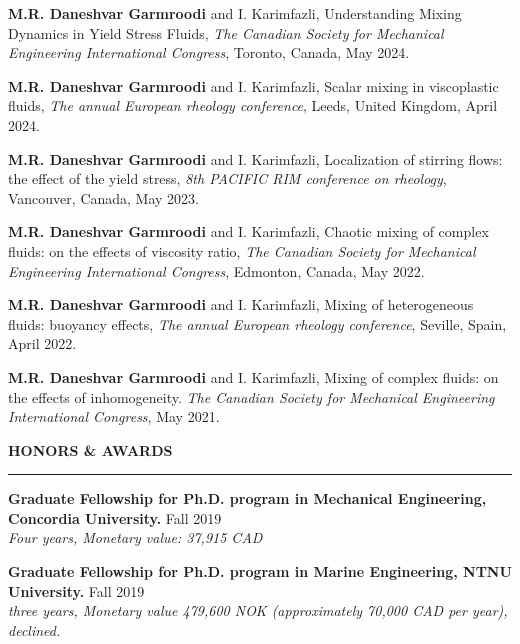 \documentclass[10pt]{article}
\begin{document}
		\noindent  \textbf{M.R. Daneshvar Garmroodi} and I. Karimfazli, Understanding Mixing Dynamics in Yield Stress
		Fluids, \textit{The Canadian Society for Mechanical Engineering International Congress}, Toronto, Canada, May 2024.
		
		\noindent \textbf{M.R. Daneshvar Garmroodi} and I. Karimfazli, Scalar mixing in viscoplastic fluids, \textit{The annual European rheology conference}, Leeds, United Kingdom, April 2024.
		
		\noindent \textbf{M.R. Daneshvar Garmroodi} and I. Karimfazli, Localization of stirring flows: the effect of the yield stress, \textit{8th PACIFIC RIM conference on rheology}, Vancouver, Canada, May 2023.
		
		\noindent \textbf{M.R. Daneshvar Garmroodi} and I. Karimfazli, Chaotic mixing of complex fluids: on the effects of viscosity ratio, \textit{The Canadian Society for Mechanical Engineering International Congress}, Edmonton, Canada, May 2022.
		
		\noindent \textbf{M.R. Daneshvar Garmroodi} and I. Karimfazli, Mixing of heterogeneous fluids: buoyancy effects, \textit{The annual European rheology conference}, Seville, Spain, April 2022.
		
		\noindent \textbf{M.R. Daneshvar Garmroodi} and I. Karimfazli, Mixing of complex fluids: on the effects of inhomogeneity. \textit{The Canadian Society for Mechanical Engineering International Congress}, May 2021.
		
		\vspace{4mm}
		
		\vspace{1.5mm}
		
		\noindent \textbf{\color{violet} HONORS \& AWARDS}
		
		\vspace{-2mm}
		
		\noindent\rule[0.5ex]{\linewidth}{1pt}
		
	\noindent \textbf {\small  Graduate Fellowship for Ph.D. program in Mechanical Engineering, Concordia University.} \hfill {Fall 2019} 
		\\ \textit{Four years, Monetary value: 37,915 CAD}
		
	
		
	\noindent \textbf {\small Graduate Fellowship for Ph.D. program in Marine Engineering, NTNU University.} \hfill {Fall 2019} 
		\\ \textit{three years, Monetary value 479,600 NOK (approximately 70,000 CAD per year), declined.}
		
\end{document}
